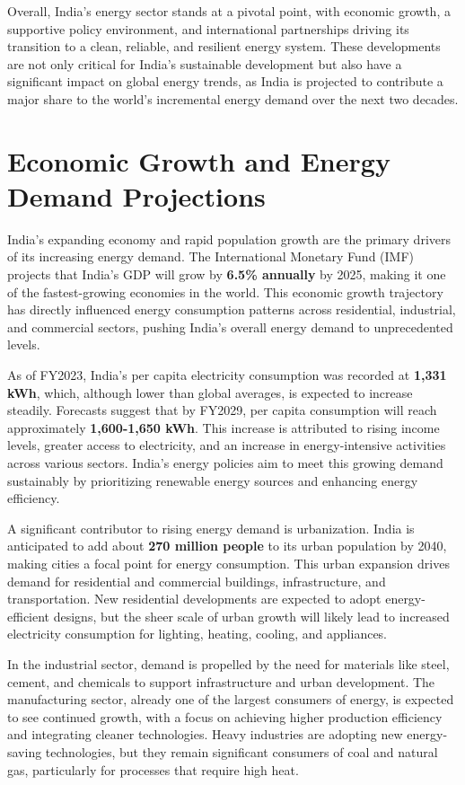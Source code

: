 \documentclass[12pt]{article}
\begin{document}
\begin{spacing}{1.5}
Overall, India’s energy sector stands at a pivotal point, with economic growth, a supportive policy environment, and international partnerships driving its transition to a clean, reliable, and resilient energy system. These developments are not only critical for India’s sustainable development but also have a significant impact on global energy trends, as India is projected to contribute a major share to the world’s incremental energy demand over the next two decades.


\section*{Economic Growth and Energy Demand Projections}
India's expanding economy and rapid population growth are the primary drivers of its increasing energy demand. The International Monetary Fund (IMF) projects that India’s GDP will grow by \textbf{6.5\% annually} by 2025, making it one of the fastest-growing economies in the world. This economic growth trajectory has directly influenced energy consumption patterns across residential, industrial, and commercial sectors, pushing India’s overall energy demand to unprecedented levels.

As of FY2023, India’s per capita electricity consumption was recorded at \textbf{1,331 kWh}, which, although lower than global averages, is expected to increase steadily. Forecasts suggest that by FY2029, per capita consumption will reach approximately \textbf{1,600-1,650 kWh}. This increase is attributed to rising income levels, greater access to electricity, and an increase in energy-intensive activities across various sectors. India's energy policies aim to meet this growing demand sustainably by prioritizing renewable energy sources and enhancing energy efficiency.

A significant contributor to rising energy demand is urbanization. India is anticipated to add about \textbf{270 million people} to its urban population by 2040, making cities a focal point for energy consumption. This urban expansion drives demand for residential and commercial buildings, infrastructure, and transportation. New residential developments are expected to adopt energy-efficient designs, but the sheer scale of urban growth will likely lead to increased electricity consumption for lighting, heating, cooling, and appliances.

In the industrial sector, demand is propelled by the need for materials like steel, cement, and chemicals to support infrastructure and urban development. The manufacturing sector, already one of the largest consumers of energy, is expected to see continued growth, with a focus on achieving higher production efficiency and integrating cleaner technologies. Heavy industries are adopting new energy-saving technologies, but they remain significant consumers of coal and natural gas, particularly for processes that require high heat.


\end{spacing}
\end{document}

